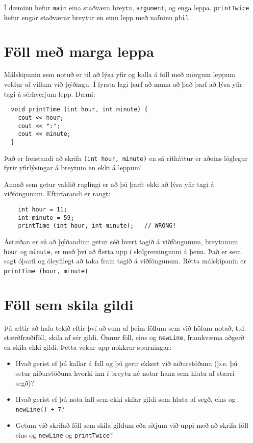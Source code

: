 Í dæminu hefur {\tt main} eina staðværa breytu, {\tt argument}, og enga leppa.
{\tt printTwice} hefur engar staðværar breytur en einn lepp með nafninu {\tt phil}.

\section {Föll með marga leppa}

Málskipanin sem notuð er til að lýsa yfir og kalla á föll með mörgum leppum veldur of villum við þýðingu.
Í fyrsta lagi þarf að muna að það þarf að lýsa yfir tagi á sérhverjum lepp.
Dæmi:
\begin{verbatim}
  void printTime (int hour, int minute) {
    cout << hour;
    cout << ":";
    cout << minute;
  }
\end{verbatim}
%
Það er freistandi að skrifa {\tt (int hour, minute)} en sá ritháttur er aðeins löglegur fyrir yfirlýsingar á breytum en ekki á leppum!

Annað sem getur valdið ruglingi er að þú þarft ekki að lýsa yfir tagi á viðföngunum.
Eftirfarandi er rangt:

\begin{verbatim}
    int hour = 11;
    int minute = 59;
    printTime (int hour, int minute);   // WRONG!
\end{verbatim}
%
Ástæðan er sú að þýðandinn getur séð hvert tagið á viðföngunum, breytunum {\tt hour} og {\tt minute}, er með því að fletta upp í skilgreiningunni á þeim.
Það er sem sagt óþarfi og óleyfilegt að taka fram tagið á viðföngunum.
Rétta málskipanin er {\tt printTime (hour, minute)}.

\section {Föll sem skila gildi}

Þú ættir að hafa tekið eftir því að sum af þeim föllum sem við höfum notað, t.d. stærðfræðiföll, skila af sér gildi.
Önnur föll, eins og {\tt newLine}, framkvæma aðgerð en skila ekki gildi.
Þetta vekur upp nokkrar spurningar:

\begin{itemize}

\item Hvað gerist ef þú kallar á fall og þú gerir ekkert við niðurstöðuna (þ.e. þú setur niðurstöðuna hvorki inn í breytu né notar hana sem hluta af stærri segð)?

\item Hvað gerist ef þú nota fall sem ekki skilar gildi sem hluta af segð, eins og {\tt newLine() + 7}?

\item Getum við skrifað föll sem skila gildum eða sitjum við uppi með að skrifa föll eins og {\tt newLine} og {\tt printTwice}?

\end{itemize}


